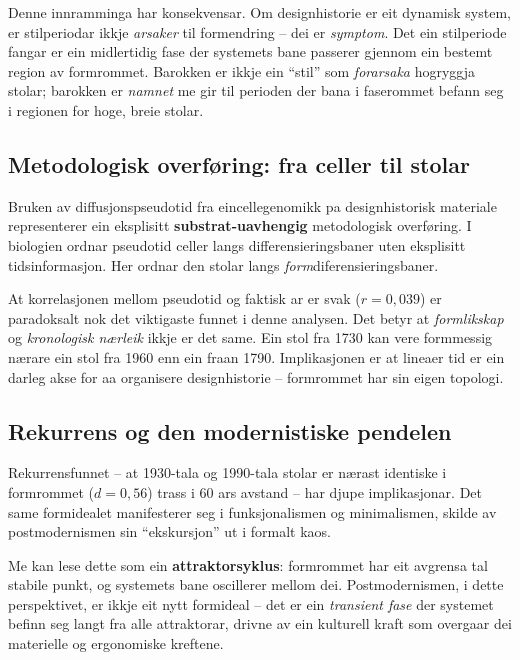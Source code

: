 \documentclass[10pt, a4paper, twocolumn]{article}
\begin{document}
Denne innramminga har konsekvensar. Om designhistorie er eit dynamisk system, er stilperiodar ikkje \emph{arsaker} til formendring -- dei er \emph{symptom}. Det ein stilperiode fangar er ein midlertidig fase der systemets bane passerer gjennom ein bestemt region av formrommet. Barokken er ikkje ein ``stil'' som \emph{forarsaka} hogryggja stolar; barokken er \emph{namnet} me gir til perioden der bana i faserommet befann seg i regionen for hoge, breie stolar.

\subsection{Metodologisk overf\o{}ring: fra celler til stolar}

Bruken av diffusjonspseudotid fra eincellegenomikk \citep{trapnell2014} pa designhistorisk materiale representerer ein eksplisitt \textbf{substrat-uavhengig} metodologisk overf\o{}ring. I biologien ordnar pseudotid celler langs differensieringsbaner uten eksplisitt tidsinformasjon. Her ordnar den stolar langs \emph{form}\-diferensieringsbaner.

At korrelasjonen mellom pseudotid og faktisk ar er svak ($r = 0{,}039$) er paradoksalt nok det viktigaste funnet i denne analysen. Det betyr at \emph{formlikskap} og \emph{kronologisk n\ae{}rleik} ikkje er det same. Ein stol fra 1730 kan vere formmessig n\ae{}rare ein stol fra 1960 enn ein fraan 1790. Implikasjonen er at lineaer tid er ein darl\-eg akse for aa organisere designhistorie -- formrommet har sin eigen topologi.

\subsection{Rekurrens og den modernistiske pendelen}

Rekurrensfunnet -- at 1930-tala og 1990-tala stolar er n\ae{}rast identiske i formrommet ($d = 0{,}56$) trass i 60 ars avstand -- har djupe implikasjonar. Det same formidealet manifesterer seg i funksjonalismen og minimalismen, skilde av postmodernismen sin ``ekskursjon'' ut i formalt kaos.

Me kan lese dette som ein \textbf{attraktorsyklus}: formrommet har eit avgrensa tal stabile punkt, og systemets bane oscillerer mellom dei. Postmodernismen, i dette perspektivet, er ikkje eit nytt formideal -- det er ein \emph{transient fase} der systemet befinn seg langt fra alle attraktorar, drivne av ein kulturell kraft som overgaar dei materielle og ergonomiske kref\-tene.
\end{document}
